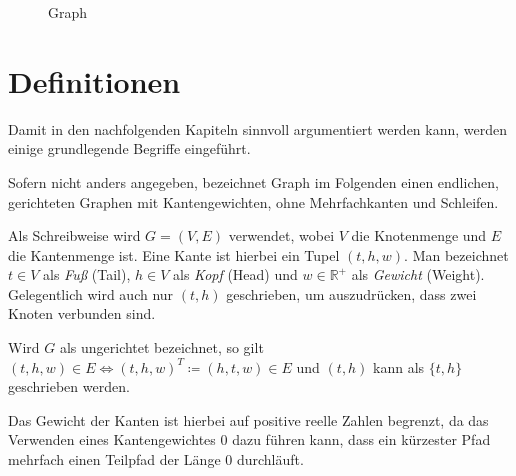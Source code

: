 \begin{figure}[ht]
  \caption{Graph}
  \label{graphs:fig:beispielgraph}
\end{figure}

\section{Definitionen}
Damit in den nachfolgenden Kapiteln sinnvoll argumentiert werden kann, werden einige grundlegende Begriffe eingeführt.

\begin{definition}[Graph]
  Sofern nicht anders angegeben, bezeichnet Graph im Folgenden einen endlichen, gerichteten Graphen mit Kantengewichten, ohne Mehrfachkanten und Schleifen.

  Als Schreibweise wird $G = (V, E)$ verwendet, wobei $V$ die Knotenmenge und $E$ die Kantenmenge ist. Eine Kante ist hierbei ein Tupel $(t, h, w)$. Man bezeichnet $t \in V$ als \emph{Fuß} (Tail), $h \in V$ als \emph{Kopf} (Head) und $w \in \mathbb{R}^+$ als \emph{Gewicht} (Weight). Gelegentlich wird auch nur $(t, h)$ geschrieben, um auszudrücken, dass zwei Knoten verbunden sind.

  Wird $G$ als ungerichtet bezeichnet, so gilt $(t, h, w) \in E \Leftrightarrow (t, h, w)^T \coloneq (h, t, w) \in E$ und $(t, h)$ kann als $\{ t, h \}$ geschrieben werden.
\end{definition}

Das Gewicht der Kanten ist hierbei auf positive reelle Zahlen begrenzt, da das Verwenden eines Kantengewichtes $0$ dazu führen kann, dass ein kürzester Pfad mehrfach einen Teilpfad der Länge 0 durchläuft.

